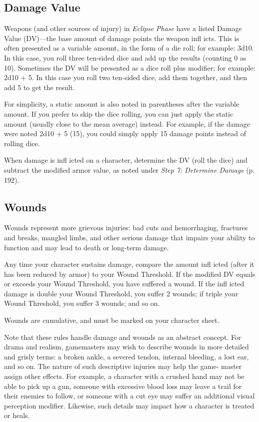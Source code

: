 \subsection{Damage Value}

Weapons (and other sources of injury) in \textit{Eclipse }
\textit{Phase} have a listed Damage Value (DV)—the base 
amount of damage points the weapon infl icts. This is 
often presented as a variable amount, in the form of a 
die roll; for example: 3d10. In this case, you roll three 
ten-sided dice and add up the results (counting 0 as 
10). Sometimes the DV will be presented as a dice roll 
plus modifier; for example: 2d10 + 5. In this case you 
roll two ten-sided dice, add them together, and then 
add 5 to get the result.

For simplicity, a static amount is also noted in 
parentheses after the variable amount. If you prefer 
to skip the dice rolling, you can just apply the static 
amount (usually close to the mean average) instead. 
For example, if the damage were noted 2d10 + 5 (15), 
you could simply apply 15 damage points instead of 
rolling dice.

When damage is infl icted on a character, determine the 
DV (roll the dice) and subtract the modified armor value, 
as noted under \textit{Step 7: Determine Damage} (p. 192).

\subsection{Wounds}

Wounds represent more grievous injuries: bad cuts and 
hemorrhaging, fractures and breaks, mangled limbs, 
and other serious damage that impairs your ability to 
function and may lead to death or long-term damage.

Any time your character sustains damage, compare 
the amount infl icted (after it has been reduced by 
armor) to your Wound Threshold. If the modified DV 
equals or exceeds your Wound Threshold, you have 
suffered a wound. If the infl icted damage is double 
your Wound Threshold, you suffer 2 wounds; if 
triple your Wound Threshold, you suffer 3 wounds; 
and so on.

Wounds are cumulative, and must be marked on 
your character sheet.

Note that these rules handle damage and wounds 
as an abstract concept. For drama and realism, 
gamemasters may wish to describe wounds in more 
detailed and grisly terms: a broken ankle, a severed 
tendon, internal bleeding, a lost ear, and so on. The 
nature of such descriptive injuries may help the game-
master assign other effects. For example, a character 
with a crushed hand may not be able to pick up a gun, 
someone with excessive blood loss may leave a trail 
for their enemies to follow, or someone with a cut eye 
may suffer an additional visual perception modifier. 
Likewise, such details may impact how a character is 
treated or heals.

